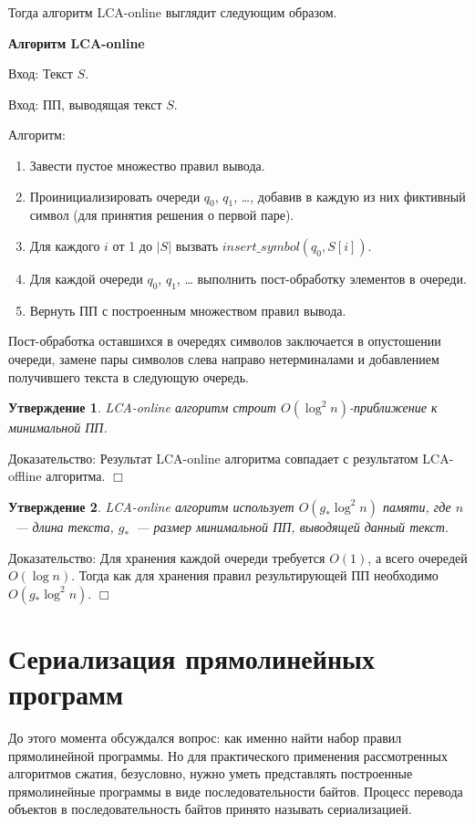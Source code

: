 \documentclass[14pt]{article}
\newtheorem{claim}{Утверждение}[section]
\begin{document}
Тогда алгоритм LCA-online выглядит следующим образом.

{\bf Алгоритм LCA-online}

{\sc Вход:} Текст $S$.

{\sc Вход:} ПП, выводящая текст $S$.

{\sc Алгоритм:}

\begin{enumerate}
	\item Завести пустое множество правил вывода.
	\item Проинициализировать очереди $q_0$, $q_1$, \ldots, добавив в каждую из них
	фиктивный символ (для принятия решения о первой паре).
	\item Для каждого $i$ от 1 до $|S|$ \newline
		вызвать $insert\_symbol(q_0, S[i])$.
	\item Для каждой очереди $q_0$, $q_1$, \ldots \newline
		выполнить пост-обработку элементов в очереди.
	\item Вернуть ПП с построенным множеством правил вывода.	
\end{enumerate}

Пост-обработка оставшихся в очередях символов заключается в опустошении очереди, замене
пары символов слева направо нетерминалами и добавлением получившего текста в следующую очередь.

\begin{claim}
	LCA-online алгоритм строит $O(\log^2 n)$-приближение к минимальной ПП.
\end{claim}

{\sc Доказательство:} Результат LCA-online алгоритма совпадает с результатом LCA-offline алгоритма. $\Box$

\begin{claim}
	LCA-online алгоритм использует $O(g_*\log^2n)$ памяти, где $n$~--- длина текста,
	$g_*$~--- размер минимальной ПП, выводящей данный текст.
\end{claim}

{\sc Доказательство:} Для хранения каждой очереди требуется $O(1)$, а всего очередей $O(\log n)$.
Тогда как для хранения правил результирующей ПП необходимо $O(g_*\log^2n)$. $\Box$
\section{Сериализация прямолинейных программ}

До этого момента обсуждался вопрос: как именно найти набор правил прямолинейной программы.
Но для практического применения рассмотренных алгоритмов сжатия, безусловно, нужно уметь представлять
построенные прямолинейные программы в виде последовательности байтов. Процесс перевода объектов
в последовательность байтов принято называть сериализацией.
\end{document}
